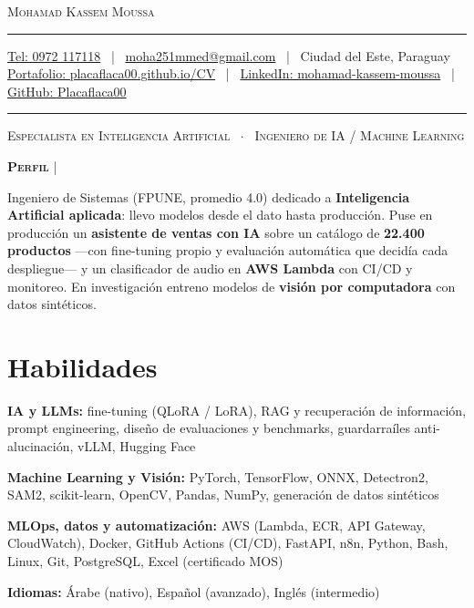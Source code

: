 \documentclass[letterpaper,10pt]{article}
\newcommand{\documentTitle}[2]{
  \begin{center}
    {\Huge\scshape\color{accentTitle} #1}
    \vspace{10pt}
    {\color{accentLine} \hrule}
    \vspace{2pt}
    \footnotesize{#2}
    \vspace{2pt}
    {\color{accentLine} \hrule}
  \end{center}
}
\newcommand{\documentSubtitle}[1]{
  \vspace{-4pt}
  \begin{center}
    {\scshape\color{accentText} #1}
  \end{center}
  \vspace{-6pt}
}
\newcommand{\tinysection}[1]{
  \phantomsection
  \addcontentsline{toc}{section}{#1}
  {\scshape\large{\bfseries\color{accentText}#1} {\color{accentLine} |}}
}
\newenvironment{resume_list}{
  \vspace{-7pt}
  \begin{itemize}[itemsep=-2px, parsep=1pt, leftmargin=30pt]
}{
  \end{itemize}
}
\begin{document}

  \documentTitle{Mohamad Kassem Moussa}{
    \href{tel:+595972117118}{Tel: 0972 117118} ~|~
    \href{mailto:moha251mmed@gmail.com}{moha251mmed@gmail.com} ~|~
    Ciudad del Este, Paraguay \\
    \vspace{2pt}
    \href{https://placaflaca00.github.io/CV/}{Portafolio: placaflaca00.github.io/CV} ~|~
    \href{https://www.linkedin.com/in/mohamad-kassem-moussa-57b3261b8/}{LinkedIn: mohamad-kassem-moussa} ~|~
    \href{https://github.com/Placaflaca00}{GitHub: Placaflaca00}
  }

  \documentSubtitle{Especialista en Inteligencia Artificial ~$\cdot$~ Ingeniero de IA / Machine Learning}


  \tinysection{Perfil}
  Ingeniero de Sistemas (FPUNE, promedio 4.0) dedicado a \textbf{Inteligencia Artificial aplicada}: llevo modelos desde el dato hasta producción. Puse en producción un \textbf{asistente de ventas con IA} sobre un catálogo de \textbf{22.400 productos} —con fine-tuning propio y evaluación automática que decidía cada despliegue— y un clasificador de audio en \textbf{AWS Lambda} con CI/CD y monitoreo. En investigación entreno modelos de \textbf{visión por computadora} con datos sintéticos.


  \section{Habilidades}

  \begin{resume_list}
    \item \textbf{IA y LLMs:} fine-tuning (QLoRA / LoRA), RAG y recuperación de información, prompt engineering, diseño de evaluaciones y benchmarks, guardarraíles anti-alucinación, vLLM, Hugging Face
    \item \textbf{Machine Learning y Visión:} PyTorch, TensorFlow, ONNX, Detectron2, SAM2, scikit-learn, OpenCV, Pandas, NumPy, generación de datos sintéticos
    \item \textbf{MLOps, datos y automatización:} AWS (Lambda, ECR, API Gateway, CloudWatch), Docker, GitHub Actions (CI/CD), FastAPI, n8n, Python, Bash, Linux, Git, PostgreSQL, Excel (certificado MOS)
    \item \textbf{Idiomas:} Árabe (nativo), Español (avanzado), Inglés (intermedio)
  \end{resume_list}
\end{document}
